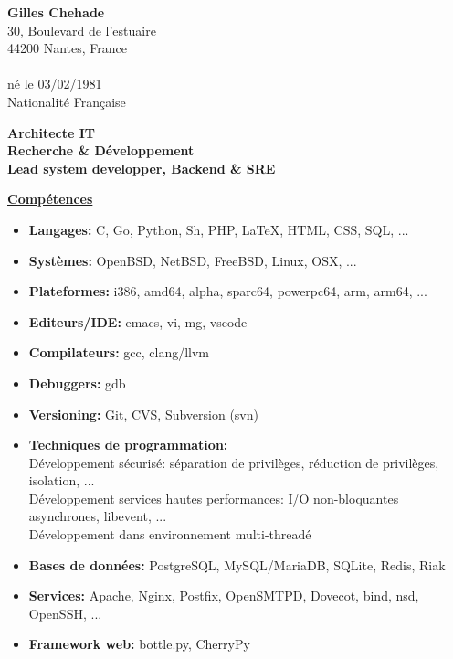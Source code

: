 \documentclass[a4paper,10pt]{letter}
\begin{document}
\textbf{Gilles Chehade}\\
30, Boulevard de l'estuaire\\
44200 Nantes, France\\
\\
n\'e le 03/02/1981\\
Nationalit\'e Fran\c caise\\

\begin{center}
  \large
  \textbf {
    Architecte IT\\
    Recherche \& D\'eveloppement\\
    Lead system developper, Backend \& SRE\\
  }
\end{center}

\normalsize

\underline{\textbf{Comp\'etences}}\\
\begin{itemize}
\item	\textbf{Langages:}
  C, Go, Python, Sh, PHP, \LaTeX, HTML, CSS, SQL, ...
\item	\textbf{Syst\`emes:}
  OpenBSD, NetBSD, FreeBSD, Linux, OSX, ...
\item	\textbf{Plateformes:}
  i386, amd64, alpha, sparc64, powerpc64, arm, arm64, ...
\item	\textbf{Editeurs/IDE:}
  emacs, vi, mg, vscode
\item	\textbf{Compilateurs:}
  gcc, clang/llvm
\item	\textbf{Debuggers:}
  gdb
\item	\textbf{Versioning:}
  Git, CVS, Subversion (svn)
\item	\textbf{Techniques de programmation:}\\
  D\'eveloppement s\'ecuris\'e: s\'eparation de
  privil\`eges, r\'eduction de privil\`eges, isolation, ...\\
  D\'eveloppement services hautes performances:
  I/O non-bloquantes asynchrones, libevent, ...\\
  D\'eveloppement dans environnement multi-thread\'e
\item	\textbf{Bases de donn\'ees:}
  PostgreSQL, MySQL/MariaDB, SQLite, Redis, Riak
\item	\textbf{Services:}
  Apache, Nginx, Postfix, OpenSMTPD, Dovecot, bind, nsd, OpenSSH, ...
\item	\textbf{Framework web:}
  bottle.py, CherryPy\\
\end{itemize}
\end{document}
